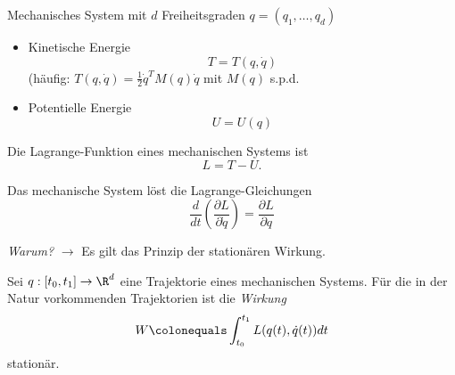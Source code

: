 Mechanisches System mit $d$ Freiheitsgraden $q = (q_1, \dots, q_d)$

\begin{itemize}
\item Kinetische Energie
  \begin{equation*}
    T = T(q, \dot q)
  \end{equation*}
  (häufig: $T(q, \dot q) = \frac12 \dot q^T M(q) \dot q$ mit $M(q)$ s.p.d.
\item Potentielle Energie
  \begin{equation*}
    U = U(q)
  \end{equation*}
\end{itemize}

\begin{definition}
  Die Lagrange-Funktion eines mechanischen Systems ist
  \begin{equation*}
    L = T - U.
  \end{equation*}
\end{definition}

Das mechanische System löst die Lagrange-Gleichungen
\begin{equation*}
  \frac{d}{dt} \left( \frac{\partial L}{\partial \dot q} \right) = \frac{\partial L}{\partial q}
\end{equation*}

\emph{Warum?} $\longrightarrow$
Es gilt das Prinzip der stationären Wirkung.

\medskip

\begin{definition}
Sei $q: [t_0, t_1] \to \R^d$ eine Trajektorie eines mechanischen Systems.
Für die in der Natur vorkommenden Trajektorien ist die \emph{Wirkung}
\begin{equation*}
  W \colonequals \int_{t_0}^{t_1} L(q(t), \dot q(t)) dt
\end{equation*}
stationär.
\end{definition}

